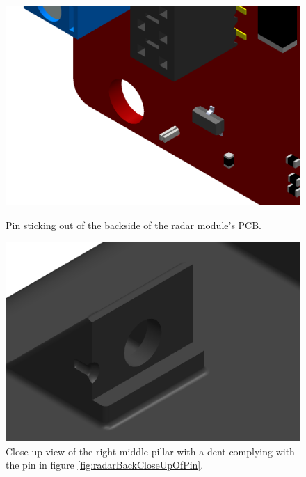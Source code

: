 \begin{figure}[H]
    \centering
    \begin{minipage}[b]{0.49\textwidth}
        \includegraphics[width=\textwidth]{Figures/CAD/radarBackCloseUpOfPin.PNG}
        \caption{Pin sticking out of the backside of the radar module's PCB.}
        \label{fig:radarBackCloseUpOfPin}
    \end{minipage}
    \begin{minipage}[b]{0.49\textwidth}
        \includegraphics[width=\textwidth]{Figures/CAD/upperRadarMountV2CloseUp2.PNG}
        \caption{Close up view of the right-middle pillar with a dent complying with the pin in figure \ref{fig:radarBackCloseUpOfPin}.}
        \label{fig:upperRadarMountV2CloseUp2}
    \end{minipage}
\end{figure}

